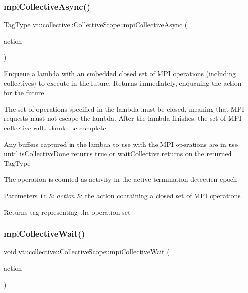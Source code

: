 \subsubsection{\texorpdfstring{mpi\+Collective\+Async()}{mpiCollectiveAsync()}}
{\footnotesize\ttfamily \hyperlink{namespacevt_a84ab281dae04a52a4b243d6bf62d0e52}{Tag\+Type} vt\+::collective\+::\+Collective\+Scope\+::mpi\+Collective\+Async (\begin{DoxyParamCaption}\item[{\hyperlink{namespacevt_ae0a5a7b18cc99d7b732cb4d44f46b0f3}{Action\+Type}}]{action }\end{DoxyParamCaption})}



Enqueue a lambda with an embedded closed set of M\+PI operations (including collectives) to execute in the future. Returns immediately, enqueuing the action for the future. 

The set of operations specified in the lambda must be closed, meaning that M\+PI requests must not escape the lambda. After the lambda finishes, the set of M\+PI collective calls should be complete.

Any buffers captured in the lambda to use with the M\+PI operations are in use until {\ttfamily is\+Collective\+Done} returns {\ttfamily true} or {\ttfamily wait\+Collective} returns on the returned {\ttfamily Tag\+Type} 

The operation is counted as activity in the active termination detection epoch


\begin{DoxyParams}[1]{Parameters}
\mbox{\tt in}  & {\em action} & the action containing a closed set of M\+PI operations\\
\hline
\end{DoxyParams}
\begin{DoxyReturn}{Returns}
tag representing the operation set 
\end{DoxyReturn}
\mbox{\label{structvt_1_1collective_1_1_collective_scope_a0ef41233afe63fc9ead8431e226af193}} 
\subsubsection{\texorpdfstring{mpi\+Collective\+Wait()}{mpiCollectiveWait()}}
{\footnotesize\ttfamily void vt\+::collective\+::\+Collective\+Scope\+::mpi\+Collective\+Wait (\begin{DoxyParamCaption}\item[{\hyperlink{namespacevt_ae0a5a7b18cc99d7b732cb4d44f46b0f3}{Action\+Type}}]{action }\end{DoxyParamCaption})}



